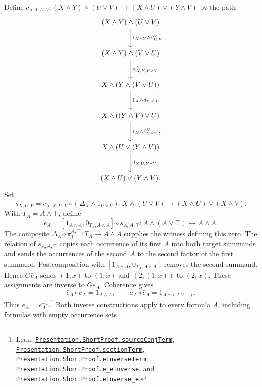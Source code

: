 \documentclass[11pt]{article}
\begin{document}
Define $c_{X,Y;U,V}:(X\wedge Y)\wedge(U\vee V)
\to(X\wedge U)\vee(Y\wedge V)$ by the path
\[
\begin{tikzcd}[row sep=large]
 (X\wedge Y)\wedge(U\vee V)
   \arrow[d,"{1_{X\wedge Y}\wedge\beta^\vee_{U,V}}"]\\
 (X\wedge Y)\wedge(V\vee U)
   \arrow[d,"{\alpha^\wedge_{X,Y,V\vee U}}"]\\
 X\wedge(Y\wedge(V\vee U))
   \arrow[d,"{1_X\wedge d_{Y,V,U}}"]\\
 X\wedge((Y\wedge V)\vee U)
   \arrow[d,"{1_X\wedge\beta^\vee_{Y\wedge V,U}}"]\\
 X\wedge(U\vee(Y\wedge V))
   \arrow[d,"{d_{X,U,Y\wedge V}}"]\\
 (X\wedge U)\vee(Y\wedge V).
\end{tikzcd}
\]
Set
\[
 s_{X,U,V}=c_{X,X;U,V}\circ(\Delta_X\wedge1_{U\vee V}):
 X\wedge(U\vee V)\longrightarrow(X\wedge U)\vee(X\wedge V).
\]
With $T_A=A\wedge\top$, define
\[
 \bar e_A=[1_{A\wedge A},0_{T_A,A\wedge A}]
                 \circ s_{A,A,\top}:
 A\wedge(A\vee\top)\longrightarrow A\wedge A.
\]
The composite $\Delta_A\circ\pi_1^{A,\top}:T_A\to A\wedge A$
supplies the witness defining this zero.
The relation of $s_{A,A,\top}$ copies each occurrence of its
first $A$ into both target summands and sends the occurrences
of the second $A$ to the second factor of the first summand.
Postcomposition with $[1_{A\wedge A},0_{T_A,A\wedge A}]$
removes the second summand. Hence $G\bar e_A$ sends
$(1,x)$ to $(1,x)$ and $(2,(1,x))$ to $(2,x)$.
These assignments are inverse to $Ge_A$. Coherence gives
\[
 \bar e_A\circ e_A=1_{A\wedge A},\qquad
 e_A\circ\bar e_A=1_{A\wedge(A\vee\top)}.
\]
Thus $\bar e_A=e_A^{-1}$.\footnote{\raggedright Lean:
\href{https://github.com/flengyel/Dosen-Petric-Maximality/blob/5dbee39bea09539bd130f729e82636419f71f920/DosenPetric/PresentationShortE.lean\#L13}{\texttt{Presentation.ShortProof.\allowbreak{}sourceConjTerm}},
\href{https://github.com/flengyel/Dosen-Petric-Maximality/blob/5dbee39bea09539bd130f729e82636419f71f920/DosenPetric/PresentationShortE.lean\#L21}{\texttt{Presentation.ShortProof.\allowbreak{}sectionTerm}},
\href{https://github.com/flengyel/Dosen-Petric-Maximality/blob/5dbee39bea09539bd130f729e82636419f71f920/DosenPetric/PresentationShortE.lean\#L30}{\texttt{Presentation.ShortProof.\allowbreak{}eInverseTerm}},
\href{https://github.com/flengyel/Dosen-Petric-Maximality/blob/5dbee39bea09539bd130f729e82636419f71f920/DosenPetric/PresentationShortE.lean\#L44}{\texttt{Presentation.ShortProof.\allowbreak{}e\_eInverse}}, and
\href{https://github.com/flengyel/Dosen-Petric-Maximality/blob/5dbee39bea09539bd130f729e82636419f71f920/DosenPetric/PresentationShortE.lean\#L50}{\texttt{Presentation.ShortProof.\allowbreak{}eInverse\_e}}.}
Both inverse constructions apply to every formula $A$, including
formulas with empty occurrence sets.
\end{document}
